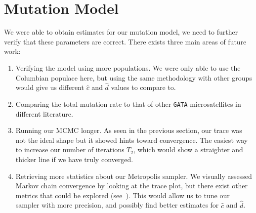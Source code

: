 \section{Mutation Model}\label{sec:mutationModel}
We were able to obtain estimates for our mutation model, we need to further verify that these parameters are correct.
There exists three main areas of future work:
\begin{enumerate}
    \item Verifying the model using more populations.
        We were only able to use the Columbian populace here, but using the same methodology with other groups would
        give us different $\hat{c}$ and $\hat{d}$ values to compare to.
    \item Comparing the total mutation rate to that of other \texttt{GATA} microsatellites in different literature.
    \item Running our MCMC longer.
        As seen in the previous section, our trace was not the ideal shape but it showed hints toward convergence.
        The easiest way to increase our number of iterations $T_2$, which would show a straighter and thicker line if
        we have truly converged.
    \item Retrieving more statistics about our Metropolis sampler.
        We visually assessed Markov chain convergence by looking at the trace plot, but there exist other metrics
        that could be explored (see~\cite{cowlesMarkovChainMonte1996}).
        This would allow us to tune our sampler with more precision, and possibly find better estimates for $\hat{c}$
        and $\hat{d}$.
\end{enumerate}

